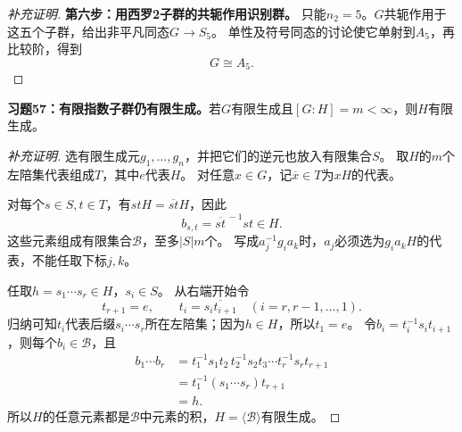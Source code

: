 \begin{proof}[补充证明]
\textbf{第六步：用西罗2子群的共轭作用识别群。}
只能$n_2=5$。$G$共轭作用于这五个子群，给出非平凡同态$G\to S_5$。
单性及符号同态的讨论使它单射到$A_5$，再比较阶，得到
\[
G\cong A_5.
\]
\end{proof}

\begin{problem}
\textbf{习题57：有限指数子群仍有限生成。}若$G$有限生成且$[G:H]=m<\infty$，则$H$有限生成。
\end{problem}
\begin{proof}[补充证明]
选有限生成元$g_1,\ldots,g_n$，并把它们的逆元也放入有限集合$S$。
取$H$的$m$个左陪集代表组成$T$，其中$e$代表$H$。
对任意$x\in G$，记$\overline x\in T$为$xH$的代表。

对每个$s\in S,t\in T$，有$stH=\overline{st}H$，因此
\[
b_{s,t}=\overline{st}^{\,-1}st\in H.
\]
这些元素组成有限集合$\mathcal B$，至多$|S|m$个。
写成$a_j^{-1}g_i a_k$时，$a_j$必须选为$g_i a_kH$的代表，不能任取下标$j,k$。

任取$h=s_1\cdots s_r\in H$，$s_i\in S$。
从右端开始令
\[
t_{r+1}=e,\qquad t_i=\overline{s_it_{i+1}}\quad(i=r,r-1,\ldots,1).
\]
归纳可知$t_i$代表后缀$s_i\cdots s_r$所在左陪集；因为$h\in H$，所以$t_1=e$。
令$b_i=t_i^{-1}s_it_{i+1}$，则每个$b_i\in\mathcal B$，且
\begin{align*}
b_1\cdots b_r
&=t_1^{-1}s_1t_2\,t_2^{-1}s_2t_3\cdots t_r^{-1}s_rt_{r+1}\\
&=t_1^{-1}(s_1\cdots s_r)t_{r+1}\\
&=h.
\end{align*}
所以$H$的任意元素都是$\mathcal B$中元素的积，$H=\langle\mathcal B\rangle$有限生成。
\end{proof}
